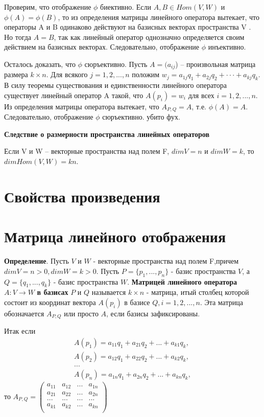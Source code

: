 \documentclass[a4paper]{article}
\begin{document}
{\begin{small}
Проверим, что отображение $\phi$ биективно. Если $A, B \in Hom(V, W)$ и
$\phi(A) = \phi(B)$, то из определения матрицы линейного оператора вытекает,
что операторы A и B одинаково действуют на базисных векторах
пространства V . Но тогда $A = B$, так как линейный оператор однозначно
определяется своим действием на базисных векторах. Следовательно,
отображение $\phi$ инъективно.

Осталось доказать, что $\phi$ сюръективно. Пусть $A = (a_{ij}$) – произвольная
матрица размера $k \times n$. Для всякого $j = 1, 2, . . . , n$ положим
$w_j = a_{1j}q_1 + a_{2j}q_2 + · · · + a_{kj}q_k$. В силу теоремы существования и
единственности линейного оператора существует линейный оператор A
такой, что $A(p_i) = w_i$ для всех $i = 1, 2, . . . , n$. Из определения матрицы
оператора вытекает, что $A_{P,Q} = A$, т.е. $\phi(A) = A$. Следовательно, отображение $\phi$ сюръективно. убито фух.

\textbf{Следствие о размерности пространства линейных операторов}

Если V и W – векторные пространства над полем F, $dim V = n$ и
$dim W = k$, то $dim Hom(V, W) = kn$.

\section*{Свойства произведения}
\section*{Матрица линейного отображения}

\textbf{Определение}. Пусть $V$ и $W$ - векторные  пространства над полем F,\newline причем $dim V = n>0, dim W = k > 0$. Пусть $P = \{ p_1, ..., p_n \}$ - базис пространства $V$, а $Q = \{ q_1, ..., q_k \}$ - базис пространства $W$. \textbf{Матрицей линейного оператора } $A: V \rightarrow W$ \textbf{в базисах} $P$ и $Q$ называется $k \times n$ - матрица, итый столбец  которой состоит из координат вектора $A(p_i)$ в базисе $Q, i = 1, 2, ..., n$. Эта матрица обозначается $A_{P,Q}$ или просто $A$, если базисы зафиксированы.

Итак если \begin{equation}
\begin{matrix}
A(p_1) = a_{11}q_1 + a_{21}q_2 + ... + a_{k1}q_k,\\
A(p_2) = a_{12}q_1 + a_{22}q_2 + ... + a_{k2}q_k,\\
...\\
A(p_n) = a_{1n}q_1 + a_{2n}q_2 + ... + a_{kn}q_k,
\end{matrix}
\end{equation}
то $\displaystyle A_{P,Q} = \begin{pmatrix}
	a_{11}& a_{12}& ...& a_{1n}\\
	a_{21}& a_{22}& ...& a_{2n}\\
	...& ...& ...& ...\\
	a_{k1}& a_{k2}& ...& a_{kn}\\
\end{pmatrix}$
 

\end{small}}
\end{document}
